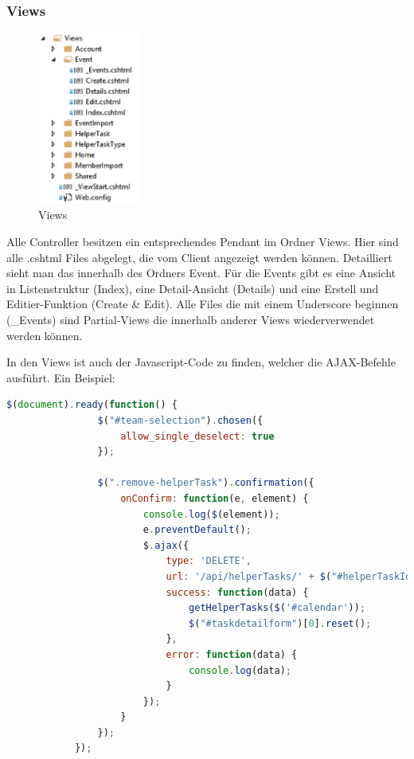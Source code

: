 		\subsubsection{Views}

			\begin{figure}[H]
		    	\centering
		    	 \includegraphics[width=0.3\textwidth]{content/architekturdokumentation/images/web-4-Views.png}
		  		\vspace{-10pt}
				\caption{Views}
			\end{figure}

			Alle Controller besitzen ein entsprechendes Pendant im Ordner Views. Hier sind alle .cshtml Files abgelegt, die vom Client angezeigt werden können.
			Detailliert sieht man das innerhalb des Ordners Event. Für die Events gibt es eine Ansicht in Listenstruktur (Index), eine Detail-Ansicht (Details) und eine Erstell und Editier-Funktion (Create \& Edit). Alle Files die mit einem Underscore beginnen (\_Events) sind Partial-Views die innerhalb anderer Views wiederverwendet werden können.

			In den Views ist auch der Javascript-Code zu finden, welcher die AJAX-Befehle ausführt. Ein Beispiel:

			\begin{lstlisting}[language=javascript, caption=text/javascript, label=lst:AJAX Example firstnumber=1]
			$(document).ready(function() {
	            $("#team-selection").chosen({
	                allow_single_deselect: true
	            });

	            $(".remove-helperTask").confirmation({
	                onConfirm: function(e, element) {
	                    console.log($(element));
	                    e.preventDefault();
	                    $.ajax({
	                        type: 'DELETE',
	                        url: '/api/helperTasks/' + $("#helperTaskId").val(),
	                        success: function(data) {
	                            getHelperTasks($('#calendar'));
	                            $("#taskdetailform")[0].reset();
	                        },
	                        error: function(data) {
	                            console.log(data);
	                        }
	                    });
	                }
	            });
	        });
			\end{lstlisting}

